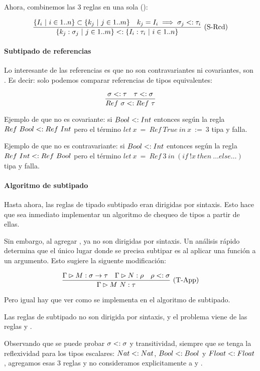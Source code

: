 Ahora, combinemos las 3 reglas en una sola ():

\[\frac{\{I_i \ |\  i \in 1..n\} \subset \{k_j \ |\  j \in 1..m\}\quad k_j = I_i \implies \sigma_j <: \tau_i}{\{k_j : \sigma_j \ |\  j \in 1..m\} <: \{I_i : \tau_i \ |\  i \in 1..n\}}\ \text{(S-Rcd)}\]

\paragraph{Subtipado de referencias}

Lo interesante de las referencias es que no son contravariantes ni covariantes, son . Es decir: solo podemos comparar referencias de tipos equivalentes:

\[\frac{\sigma <: \tau\quad \tau <: \sigma}{Ref\ \sigma <: Ref\ \tau}\]

Ejemplo de que no es covariante: si $Bool <: Int$ entonces según la regla $Ref\ Bool <: Ref\ Int$ pero el término $let\ x\ =\ Ref\ True\ in\ x\ :=\ 3$ tipa y falla.

Ejemplo de que no es contravariante: si $Bool <: Int$ entonces según la regla $Ref\ Int <: Ref\ Bool$ pero el término $let\ x\ =\ Ref\ 3\ in\ (if\ !x\ then\ \dots else \dots)$ tipa y falla.

\paragraph{Algoritmo de subtipado}

Hasta ahora, las reglas de tipado  subtipado eran dirigidas por sintaxis. Esto hace que sea inmediato implementar un algoritmo de chequeo de tipos a partir de ellas.

Sin embargo, al agregar , ya no son dirigidas por sintaxis. Un análisis rápido determina que el único lugar donde se precisa subtipar es al aplicar una función a un argumento. Esto sugiere la siguente modificación:

\[\frac{\Gamma \rhd M : \sigma\to\tau\quad \Gamma \rhd N : \rho\quad \rho <: \sigma}{\Gamma \rhd M\ N : \tau}\ \text{(T-App)}\]

Pero igual hay que ver como se implementa en el algoritmo de subtipado.

Las reglas de subtipado no son dirigida por sintaxis, y el problema viene de las reglas  y .

Observando que se puede probar $\sigma <: \sigma$ y transitividad, siempre que se tenga la reflexividad para los tipos escalares: $Nat <: Nat$, $Bool <: Bool$ y $Float <: Float$, agregamos esas 3 reglas y no consideramos explicitamente a  y .

